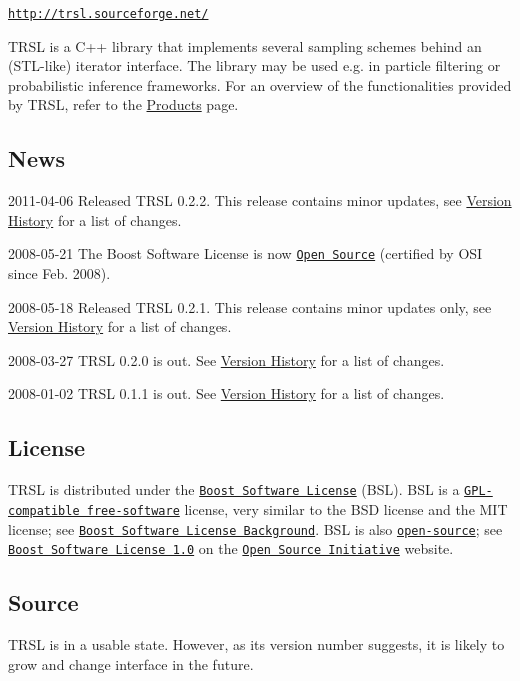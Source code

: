 \begin{center}\href{http://trsl.sourceforge.net/}{\tt http://trsl.sourceforge.net/}\end{center} 

TRSL is a C++ library that implements several sampling schemes behind an (STL-\/like) iterator interface. The library may be used e.g. in particle filtering or probabilistic inference frameworks. For an overview of the functionalities provided by TRSL, refer to the \hyperlink{group__products}{Products} page.\hypertarget{index_News}{}\subsection{News}\label{index_News}

\begin{DoxyDescription}
\item[2011-\/04-\/06 ]Released TRSL 0.2.2. This release contains minor updates, see \hyperlink{group__version__history}{Version History} for a list of changes.  
\item[2008-\/05-\/21 ]The Boost Software License is now \href{http://www.opensource.org/licenses/bsl1.0.html}{\tt Open Source} (certified by OSI since Feb. 2008). 
\item[2008-\/05-\/18 ]Released TRSL 0.2.1. This release contains minor updates only, see \hyperlink{group__version__history}{Version History} for a list of changes.  
\item[2008-\/03-\/27 ]TRSL 0.2.0 is out. See \hyperlink{group__version__history}{Version History} for a list of changes.  
\item[2008-\/01-\/02 ]TRSL 0.1.1 is out. See \hyperlink{group__version__history}{Version History} for a list of changes.  
\end{DoxyDescription}\hypertarget{index_index_license}{}\subsection{License}\label{index_index_license}
TRSL is distributed under the \href{http://www.boost.org/LICENSE_1_0.txt}{\tt Boost Software License} (BSL). BSL is a \href{http://www.fsf.org/licensing/licenses}{\tt GPL-\/compatible free-\/software} license, very similar to the BSD license and the MIT license; see \href{http://www.boost.org/more/license_info.html}{\tt Boost Software License Background}. BSL is also \href{http://www.opensource.org/docs/osd}{\tt open-\/source}; see \href{http://www.opensource.org/licenses/bsl1.0.html}{\tt Boost Software License 1.0} on the \href{http://www.opensource.org/}{\tt Open Source Initiative} website.\hypertarget{index_index_services}{}\subsection{Source}\label{index_index_services}
TRSL is in a usable state. However, as its version number suggests, it is likely to grow and change interface in the future.


